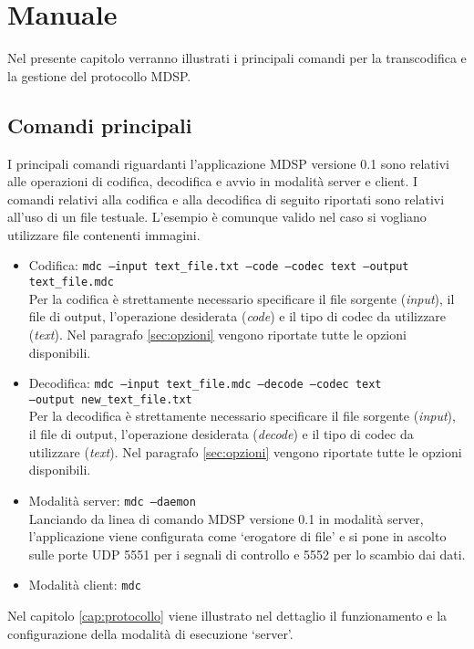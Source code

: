 \chapter{Manuale}
Nel presente capitolo verranno illustrati i principali comandi per la
transcodifica e la gestione del protocollo MDSP.

\section{Comandi principali}
I principali comandi riguardanti l'applicazione MDSP versione 0.1 sono relativi
alle operazioni di codifica, decodifica e avvio in modalità server e client. I
comandi relativi alla codifica e alla decodifica di seguito riportati sono
relativi all'uso di un file testuale. L'esempio è comunque valido nel caso si
vogliano utilizzare file contenenti immagini.

\begin{itemize}
  \item Codifica: \texttt{mdc --input text\_file.txt --code --codec text
  --output text\_file.mdc}\\ Per la codifica è strettamente necessario
  specificare il file sorgente (\emph{input}), il file di output, l'operazione desiderata (\emph{code}) e il
tipo di codec da utilizzare (\emph{text}). Nel paragrafo \ref{sec:opzioni} vengono riportate tutte le opzioni disponibili. 
  \item Decodifica: \texttt{mdc --input text\_file.mdc --decode --codec
  text\\ --output new\_text\_file.txt}\\ Per la decodifica è strettamente
  necessario specificare il file sorgente (\emph{input}), il file di output, l'operazione desiderata (\emph{decode}) e il
tipo di codec da utilizzare (\emph{text}). Nel paragrafo \ref{sec:opzioni} vengono riportate tutte le opzioni disponibili.
  \item Modalità server: \texttt{mdc --daemon}\\ Lanciando da linea di comando
  MDSP versione 0.1 in modalità server, l'applicazione viene configurata come `erogatore di file' e si pone in ascolto
sulle porte UDP 5551 per i segnali di controllo e 5552 per lo scambio dai dati.
  \item Modalità client: \texttt{mdc}
\end{itemize}

Nel capitolo \ref{cap:protocollo} viene illustrato nel dettaglio il
funzionamento e la configurazione della modalità di esecuzione `server'.


